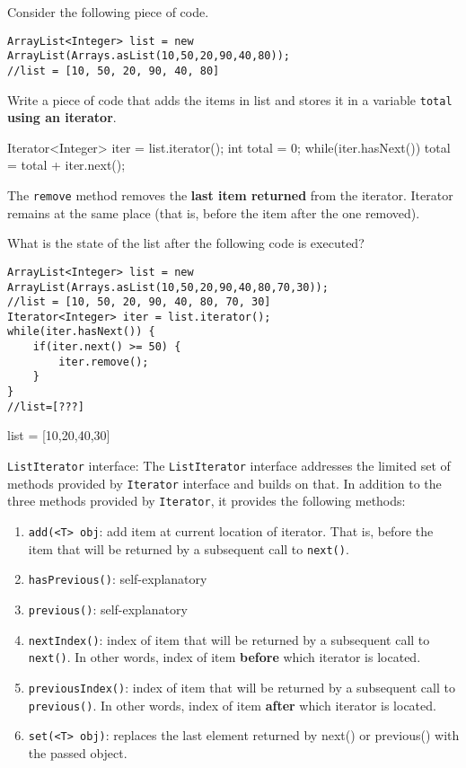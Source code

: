 \documentclass{exam}
\begin{document}
\begin{questions}
\question Consider the following piece of code.

\begin{lstlisting}
ArrayList<Integer> list = new ArrayList(Arrays.asList(10,50,20,90,40,80));
//list = [10, 50, 20, 90, 40, 80]
\end{lstlisting}

Write a piece of code that adds the items in list and stores it in a variable \texttt{total} \textbf{using an iterator}.

\ifprintanswers
Iterator<Integer> iter = list.iterator();
int total = 0;
while(iter.hasNext()) {
	total = total + iter.next();
}
\else
\fi

\ifprintanswers
\else
\newpage
\fi

\question The \texttt{remove} method removes the \textbf{last item returned} from the iterator. Iterator remains at the same place (that is, before the item after the one removed).

What is the state of the list after the following code is executed?

\begin{lstlisting}
ArrayList<Integer> list = new ArrayList(Arrays.asList(10,50,20,90,40,80,70,30));
//list = [10, 50, 20, 90, 40, 80, 70, 30]
Iterator<Integer> iter = list.iterator();
while(iter.hasNext()) {
	if(iter.next() >= 50) {
		iter.remove();
	}
}
//list=[???]
\end{lstlisting}

\ifprintanswers
list = [10,20,40,30]
\else
\fi

\question \texttt{ListIterator} interface: The \texttt{ListIterator} interface addresses the limited set of methods provided by \texttt{Iterator} interface and builds on that. In addition to the three methods provided by \texttt{Iterator}, it provides the following methods:

\begin{enumerate}
\item \texttt{add(<T> obj}: add item at current location of iterator. That is, before the item that will be returned by a subsequent call to \texttt{next()}.
\item \texttt{hasPrevious()}: self-explanatory
\item \texttt{previous()}: self-explanatory
\item \texttt{nextIndex()}: index of item that will be returned by a subsequent call to \texttt{next()}. In other words, index of item \textbf{before} which iterator is located.
\item \texttt{previousIndex()}: index of item that will be returned by a subsequent call to \texttt{previous()}. In other words, index of item \textbf{after} which iterator is located.
\item \texttt{set(<T> obj)}: replaces the last element returned by next() or previous() with the passed object.
\end{enumerate}



\end{questions}
\end{document}
